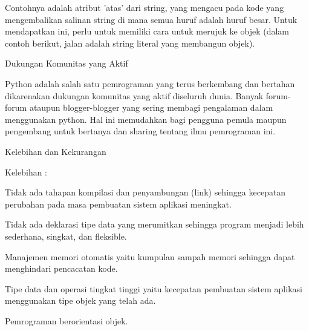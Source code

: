 \vspace{14pt}
\noindent 
{\fontsize{14pt}{14pt}\selectfont Contohnya adalah atribut 'atas' dari string, yang mengacu pada kode yang mengembalikan salinan string di mana semua huruf adalah huruf besar. Untuk mendapatkan ini, perlu untuk memiliki cara untuk merujuk ke objek (dalam contoh berikut, jalan adalah string literal yang membangun objek). \\} \par
\vspace{14pt}
\noindent 
{\fontsize{14pt}{14pt}\selectfont Dukungan Komunitas yang Aktif \\} \par
\noindent 
{\fontsize{14pt}{14pt}\selectfont Python adalah salah satu pemrograman yang terus berkembang dan bertahan dikarenakan dukungan komunitas yang aktif diseluruh dunia. Banyak forum-forum ataupun blogger-blogger yang sering membagi pengalaman dalam menggunakan python. Hal ini memudahkan bagi pengguna pemula maupun pengembang untuk bertanya dan sharing tentang ilmu pemrograman ini. \\} \par
\noindent 
{\fontsize{14pt}{14pt}\selectfont Kelebihan dan Kekurangan \\} \par
\noindent 
{\fontsize{14pt}{14pt}\selectfont Kelebihan : \\} \par
\noindent 
{\fontsize{14pt}{14pt}\selectfont Tidak ada tahapan kompilasi dan penyambungan (link) sehingga kecepatan perubahan pada masa pembuatan sistem aplikasi meningkat. \\} \par
\noindent 
{\fontsize{14pt}{14pt}\selectfont Tidak ada deklarasi tipe data yang merumitkan sehingga program menjadi lebih sederhana, singkat, dan fleksible. \\} \par
\noindent 
{\fontsize{14pt}{14pt}\selectfont Manajemen memori otomatis yaitu kumpulan sampah memori sehingga dapat menghindari pencacatan kode. \\} \par
\noindent 
{\fontsize{14pt}{14pt}\selectfont Tipe data dan operasi tingkat tinggi yaitu kecepatan pembuatan sistem aplikasi menggunakan tipe objek yang telah ada. \\} \par
\noindent 
{\fontsize{14pt}{14pt}\selectfont Pemrograman berorientasi objek. \\} \par
